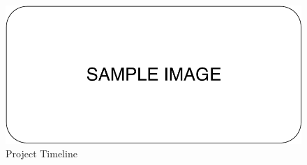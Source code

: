 \begin{figure}[ht]
	\centering
	\includegraphics[scale=0.7]{Images/SampleImage.pdf}
	\caption{Project Timeline}
	\label{fig:projectPlan}
\end{figure}